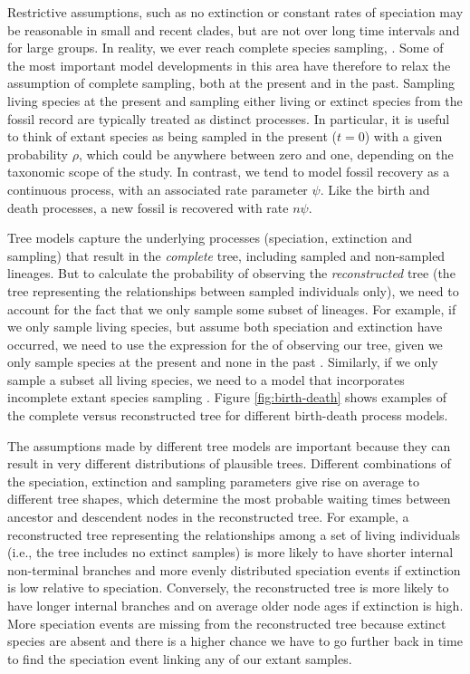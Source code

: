 Restrictive assumptions, such as no extinction or constant rates of speciation may be reasonable in small and recent clades, but are not  over long time intervals and for large groups.
In reality, we  ever reach complete species sampling, .
Some of the most important model developments in this area have therefore  to relax the assumption of complete sampling, both at the present and in the past.
Sampling living species at the present and sampling either living or extinct species from the fossil record are typically treated as distinct processes.
In particular, it is useful to think of extant species as being sampled in the present ($t=0$) with a given probability $\rho$, which could be anywhere between zero and one, depending on the taxonomic scope of the study.
In contrast, we tend to model fossil recovery as a continuous process, with an associated rate parameter $\psi$. Like the birth and death processes, a new fossil is recovered with rate $n\psi$.

Tree models capture the underlying processes (speciation, extinction and sampling) that result in the \textit{complete} tree, including sampled and non-sampled lineages. But to calculate the probability of observing the  \textit{reconstructed} tree (the tree representing the relationships between sampled individuals only), we need to account for the fact that we only sample some subset of lineages.
For example, if we only sample living species, but assume both speciation and extinction have occurred, we need to use the expression for the  of observing our tree, given we only sample species at the present and none in the past \citep{Thompson1975,Gernhard2008, Stadler2009}.  Similarly, if we only sample a subset  all living species, we need to  a model that incorporates incomplete extant species sampling \citep{Yang1997,Stadler2009}.
Figure \ref{fig:birth-death} shows examples of the complete versus  reconstructed tree for different birth-death process models.


The assumptions made by different tree models are important because they can result in very different distributions of plausible trees.
Different combinations of the speciation, extinction and sampling parameters give rise on average to different tree shapes, which determine the most probable waiting times between ancestor and descendent nodes
in the reconstructed tree.
For example, a reconstructed tree representing the relationships among a set of living individuals (i.e., the tree includes no extinct samples) is more likely to have shorter internal non-terminal branches and more evenly distributed speciation events if extinction is low relative to speciation.
Conversely, the reconstructed tree is more likely to have longer internal branches and on average older node ages if extinction is high.
More speciation events are missing from the reconstructed tree because extinct species are absent and there is a higher chance we have to go further back in time to find the speciation event linking any of our extant samples.

